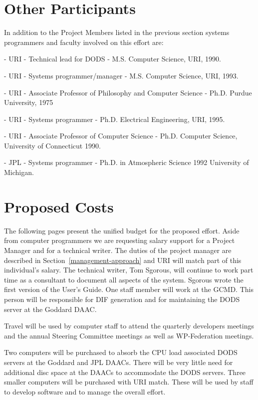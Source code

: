 \documentclass[12pt]{article}
\begin{document}
\section{Other Participants}\label{other-participants}

In addition to the Project Members listed in the previous section
systems programmers and faculty involved on this effort are:
\bigskip

 - \ac{URI} - Technical lead for \ac{DODS}
- M.S. Computer Science, \ac{URI}, 1990.

 - \ac{URI} - Systems programmer/manager - 
M.S. Computer Science, \ac{URI}, 1993.

 - \ac{URI} - Associate Professor of 
Philosophy and Computer Science - Ph.D. Purdue University, 1975 

 - \ac{URI}  - Systems programmer - 
Ph.D. Electrical Engineering, \ac{URI}, 1995.

 - \ac{URI} - Associate Professor of Computer 
Science - Ph.D. Computer Science, University of Connecticut 1990.

 - \ac{JPL} - Systems programmer - 
Ph.D. in Atmospheric Science 1992 University of Michigan.


\section{Proposed Costs}\label{budget}

The following pages present the unified budget for the proposed effort.
Aside from computer programmers we are requesting salary support for
a Project Manager and for a technical writer. The duties of the project
manager are described in Section~\ref{management-approach} and \ac{URI}
will match part of this individual's salary. The technical
writer, Tom Sgorous, will continue to work part time as a consultant to 
document all aspects of the system. Sgorous wrote the first version
of the User's Guide. One staff member will work at the \ac{GCMD}. This
person will be responsible for \ac{DIF} generation and for maintaining
the \ac{DODS} server at the Goddard \ac{DAAC}.

Travel will be used by computer staff to attend the quarterly 
developers meetings and the annual Steering Committee meetings 
as well as WP-Federation meetings.

Two computers will be purchased to absorb the \ac{CPU} load associated 
\ac{DODS} servers at the Goddard and \ac{JPL} \ac{DAAC}s. There will
be very little need for additional disc space at the \ac{DAAC}s to
accommodate the \ac{DODS} servers. Three smaller computers will be 
purchased with \ac{URI} match. These will be used by staff to 
develop software and to manage the overall effort.
\end{document}
